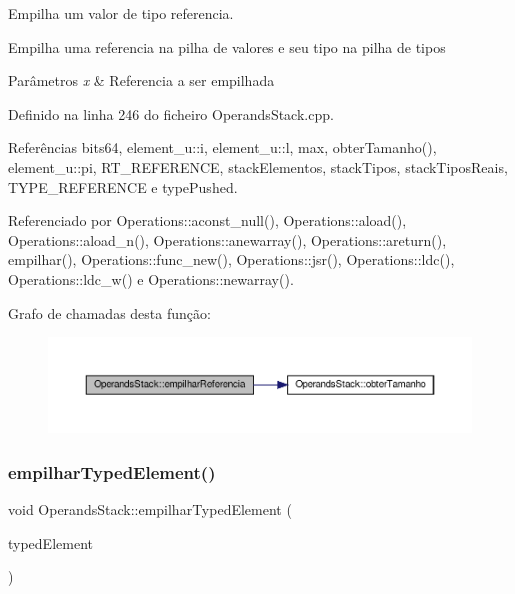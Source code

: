 Empilha um valor de tipo referencia. 

Empilha uma referencia na pilha de valores e seu tipo na pilha de tipos


\begin{DoxyParams}{Parâmetros}
{\em x} & Referencia a ser empilhada \\
\hline
\end{DoxyParams}


Definido na linha 246 do ficheiro Operands\+Stack.\+cpp.



Referências bits64, element\+\_\+u\+::i, element\+\_\+u\+::l, max, obter\+Tamanho(), element\+\_\+u\+::pi, R\+T\+\_\+\+R\+E\+F\+E\+R\+E\+N\+CE, stack\+Elementos, stack\+Tipos, stack\+Tipos\+Reais, T\+Y\+P\+E\+\_\+\+R\+E\+F\+E\+R\+E\+N\+CE e type\+Pushed.



Referenciado por Operations\+::aconst\+\_\+null(), Operations\+::aload(), Operations\+::aload\+\_\+n(), Operations\+::anewarray(), Operations\+::areturn(), empilhar(), Operations\+::func\+\_\+new(), Operations\+::jsr(), Operations\+::ldc(), Operations\+::ldc\+\_\+w() e Operations\+::newarray().

Grafo de chamadas desta função\+:
\nopagebreak
\begin{figure}[H]
\begin{center}
\leavevmode
\includegraphics[width=350pt]{classOperandsStack_a47af7d965172984b9cc5c61d8c4c1ce3_cgraph}
\end{center}
\end{figure}
\mbox{\label{classOperandsStack_a73960b4536c99847bf4545a45f04f089}} 
\subsubsection{\texorpdfstring{empilhar\+Typed\+Element()}{empilharTypedElement()}}
{\footnotesize\ttfamily void Operands\+Stack\+::empilhar\+Typed\+Element (\begin{DoxyParamCaption}\item[{\hyperlink{BasicTypes_8h_a97b332303b1262282599e6ede0637b82}{Typed\+Element}}]{typed\+Element }\end{DoxyParamCaption})}



